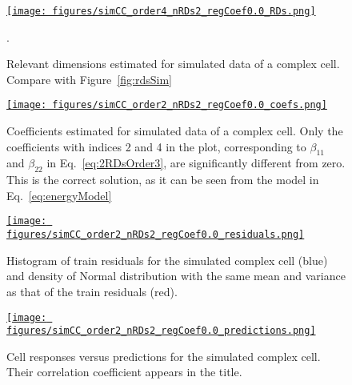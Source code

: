 \documentclass[12pt]{article}
\begin{document}
\begin{figure}[H]
    \begin{center}
        \href{https://www.gatsby.ucl.ac.uk/~rapela/neuroinformatics/2023/ws6/figures/simCC_order4_nRDs2_regCoef0.0_RDs.html}{\texttt{[image: figures/simCC\_order4\_nRDs2\_regCoef0.0\_RDs.png]}}

        \caption{Relevant dimensions estimated for simulated data of a complex cell. Compare with Figure~\ref{fig:rdsSim}}.

        \label{fig:analysis_simCC_rds}
    \end{center}
\end{figure}

\begin{figure}[H]
    \begin{center}
        \href{https://www.gatsby.ucl.ac.uk/~rapela/neuroinformatics/2023/ws6/figures/simCC_order2_nRDs2_regCoef0.0_coefs.html}{\texttt{[image: figures/simCC\_order2\_nRDs2\_regCoef0.0\_coefs.png]}}

        \caption{Coefficients estimated for simulated data of a complex cell.
        Only the coefficients with indices 2 and 4 in the plot, corresponding to $\beta_{11}$ and
        $\beta_{22}$ in Eq.~\ref{eq:2RDsOrder3}, are significantly different from
        zero. This is the correct solution, as it can be seen from the model in
        Eq.~\ref{eq:energyModel}}

        \label{fig:analysis_simCC_coefs}
    \end{center}
\end{figure}

\begin{figure}[H]
    \begin{center}
        \href{https://www.gatsby.ucl.ac.uk/~rapela/neuroinformatics/2023/ws6/figures/simCC_order2_nRDs2_regCoef0.0_residuals.html}{\texttt{[image: figures/simCC\_order2\_nRDs2\_regCoef0.0\_residuals.png]}}

        \caption{Histogram of train residuals for the simulated complex cell (blue) and density of Normal distribution with the same mean and variance as that of the train residuals (red).}

        \label{fig:analysis_simCC_histResiduals}
    \end{center}
\end{figure}

\begin{figure}[H]
    \begin{center}
        \href{https://www.gatsby.ucl.ac.uk/~rapela/neuroinformatics/2023/ws6/figures/simCC_order2_nRDs2_regCoef0.0_predictions.html}{\texttt{[image: figures/simCC\_order2\_nRDs2\_regCoef0.0\_predictions.png]}}

        \caption{Cell responses versus predictions for the simulated complex cell. Their correlation coefficient appears in the title.}

        \label{fig:analysis_simCC_fittedRes}
    \end{center}
\end{figure}
\end{document}
